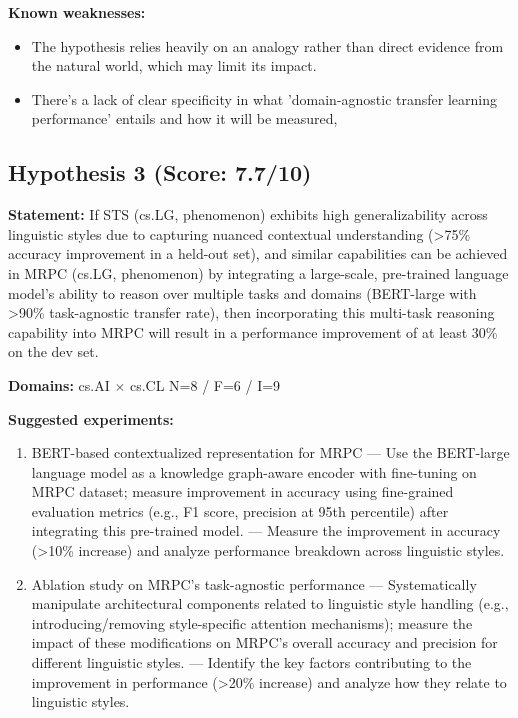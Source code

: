 \documentclass[12pt,a4paper]{article}
\begin{document}
\textbf{Known weaknesses:}
\begin{itemize}
  \item The hypothesis relies heavily on an analogy rather than direct evidence from the natural world, which may limit its impact.
  \item There's a lack of clear specificity in what 'domain-agnostic transfer learning performance' entails and how it will be measured,
\end{itemize}
\subsection*{Hypothesis 3 (Score: 7.7/10)}

\textbf{Statement:} If STS (cs.LG, phenomenon) exhibits high generalizability across linguistic styles due to capturing nuanced contextual understanding (>75\% accuracy improvement in a held-out set), and similar capabilities can be achieved in MRPC (cs.LG, phenomenon) by integrating a large-scale, pre-trained language model's ability to reason over multiple tasks and domains (BERT-large with >90\% task-agnostic transfer rate), then incorporating this multi-task reasoning capability into MRPC will result in a performance improvement of at least 30\% on the dev set.

\noindent\textbf{Domains:} cs.AI $\times$ cs.CL
\hspace{1em} N=8 / F=6 / I=9

\textbf{Suggested experiments:}
\begin{enumerate}
  \item BERT-based contextualized representation for MRPC — Use the BERT-large language model as a knowledge graph-aware encoder with fine-tuning on MRPC dataset; measure improvement in accuracy using fine-grained evaluation metrics (e.g., F1 score, precision at 95th percentile) after integrating this pre-trained model. — Measure the improvement in accuracy (>10\% increase) and analyze performance breakdown across linguistic styles.
  \item Ablation study on MRPC's task-agnostic performance — Systematically manipulate architectural components related to linguistic style handling (e.g., introducing/removing style-specific attention mechanisms); measure the impact of these modifications on MRPC's overall accuracy and precision for different linguistic styles. — Identify the key factors contributing to the improvement in performance (>20\% increase) and analyze how they relate to linguistic styles.
\end{enumerate}
\end{document}
